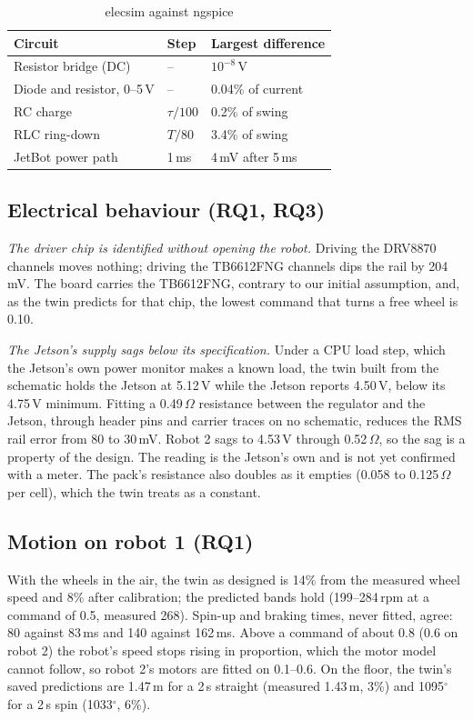\documentclass[conference,a4paper]{IEEEtran}
\begin{document}
\begin{table}[t]
\caption{elecsim against ngspice}
\label{tab:spice}
\centering\footnotesize
\setlength{\tabcolsep}{3pt}
\begin{tabular}{@{}lll@{}}
\toprule
Circuit & Step & Largest difference \\
\midrule
Resistor bridge (DC) & -- & $10^{-8}$\,V \\
Diode and resistor, 0--5\,V & -- & 0.04\% of current \\
RC charge & $\tau/100$ & 0.2\% of swing \\
RLC ring-down & $T/80$ & 3.4\% of swing \\
JetBot power path & 1\,ms & 4\,mV after 5\,ms \\
\bottomrule
\end{tabular}
\end{table}

\subsection{Electrical behaviour (RQ1, RQ3)}
\emph{The driver chip is identified without opening the robot.} Driving the
DRV8870 channels moves nothing; driving the TB6612FNG channels dips the rail
by 204\,mV. The board carries the TB6612FNG, contrary to our initial
assumption, and, as the twin predicts for that chip, the lowest command that
turns a free wheel is 0.10.

\emph{The Jetson's supply sags below its specification.} Under a CPU load
step, which the Jetson's own power monitor makes a known load, the twin built
from the schematic holds the Jetson at 5.12\,V while the Jetson reports
4.50\,V, below its 4.75\,V minimum. Fitting a 0.49\,$\Omega$ resistance between
the regulator and the Jetson, through header pins and carrier traces on no
schematic, reduces the RMS rail error from 80 to 30\,mV. Robot 2 sags to
4.53\,V through 0.52\,$\Omega$, so the sag is a property of the design. The
reading is the Jetson's own and is not yet confirmed with a meter. The pack's
resistance also doubles as it empties (0.058 to 0.125\,$\Omega$ per cell),
which the twin treats as a constant.

\subsection{Motion on robot 1 (RQ1)}
With the wheels in the air, the twin as designed is 14\% from the measured
wheel speed and 8\% after calibration; the predicted bands hold (199--284\,rpm
at a command of 0.5, measured 268). Spin-up and braking times, never fitted,
agree: 80 against 83\,ms and 140 against 162\,ms. Above a command of about
0.8 (0.6 on robot 2) the robot's speed stops rising in proportion, which the
motor model cannot follow, so robot 2's motors are fitted on 0.1--0.6. On the
floor, the twin's saved predictions are 1.47\,m for a 2\,s straight (measured
1.43\,m, 3\%) and 1095$^\circ$ for a 2\,s spin (1033$^\circ$, 6\%).
\end{document}
